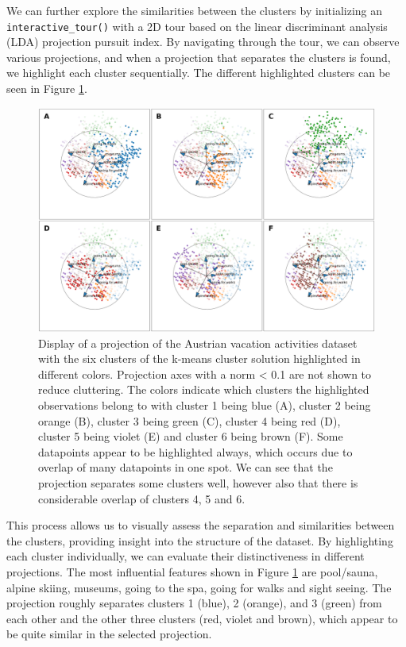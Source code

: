 \documentclass[article]{ajs}
\begin{document}
We can further explore the similarities between the clusters by initializing an \texttt{interactive\_tour()} with a 2D tour based on the linear discriminant analysis (LDA) projection pursuit index. By navigating through the tour, we can observe various projections, and when a projection that separates the clusters is found, we highlight each cluster sequentially. The different highlighted clusters can be seen in Figure \ref{fig:winter_activ_cluster_highlights}.

\begin{figure}[h!]
    \centering
    \includegraphics[width=1\textwidth]{winter_activ_cluster_highlights.pdf}
    \caption{Display of a projection of the Austrian vacation activities dataset with the six clusters of the k-means cluster solution highlighted in different colors. Projection axes with a norm < 0.1 are not shown to reduce cluttering. The colors indicate which clusters the highlighted observations belong to with cluster 1 being blue (A), cluster 2 being orange (B), cluster 3 being green (C), cluster 4 being red (D), cluster 5 being violet (E) and cluster 6 being brown (F). Some datapoints appear to be highlighted always, which occurs due to overlap of many datapoints in one spot. We can see that the projection separates some clusters well, however also that there is considerable overlap of clusters 4, 5 and 6.}
    \label{fig:winter_activ_cluster_highlights}
\end{figure}

This process allows us to visually assess the separation and similarities between the clusters, providing insight into the structure of the dataset. By highlighting each cluster individually, we can evaluate their distinctiveness in different projections. The most influential features shown in Figure \ref{fig:winter_activ_cluster_highlights} are pool/sauna, alpine skiing, museums, going to the spa, going for walks and sight seeing. The projection roughly separates clusters 1 (blue), 2 (orange), and 3 (green) from each other and the other three clusters (red, violet and brown), which appear to be quite similar in the selected projection. 
\end{document}
